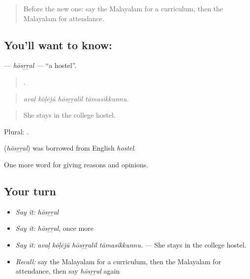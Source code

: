 \label{lesson:ML-C434-hosrral}



\begin{quote}
Before the new one: say the Malayalam for a curriculum, then the Malayalam for attendance.
\end{quote}

\subsection*{You'll want to know: }
\textbf{} — \emph{hōsṟṟal} — \textquotedblleft{}a hostel\textquotedblright{}.

\begin{quote}
   .
\end{quote}

\begin{quote}
\emph{avaḷ kōḷējŭ hōsṟṟalil tāmasikkunnu.}
\end{quote}

\begin{quote}
She stays in the college hostel.
\end{quote}

Plural: .

\begin{cousinweb}
\textbf{} (\emph{hōsṟṟal}) was borrowed from English \emph{hostel}.
\end{cousinweb}

\begin{grammarlens}[title={What you've built}]
One more word for giving reasons and opinions.
\end{grammarlens}

\subsection*{Your turn}
\begin{itemize}
\raggedright
  \item \emph{Say it:} \emph{hōsṟṟal}
  \item \emph{Say it:} \emph{hōsṟṟal}, once more
  \item \emph{Say it:} \emph{avaḷ kōḷējŭ hōsṟṟalil tāmasikkunnu.} — She stays in the college hostel.
  \item \emph{Recall:} say the Malayalam for a curriculum, then the Malayalam for attendance, then say \emph{hōsṟṟal} again
\end{itemize}

